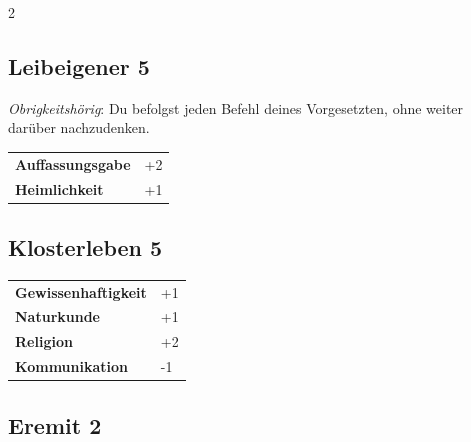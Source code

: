 \begin{multicols}{2}
\begin{tcolorbox}
    \subsection*{Leibeigener \hfill \small{5 }}
    \tcblower
\textit{Obrigkeitshörig}: Du befolgst jeden Befehl deines Vorgesetzten, ohne weiter darüber nachzudenken.


\vspace{3mm}

\begin{tabular}{@{}ll@{}}
    \textbf{Auffassungsgabe} & +2\\
    \textbf{Heimlichkeit} & +1\\
\end{tabular}


\end{tcolorbox}

\begin{tcolorbox}
    \subsection*{Klosterleben \hfill \small{5 }}
    \tcblower




\begin{tabular}{@{}ll@{}}
    \textbf{Gewissenhaftigkeit} & +1\\
    \textbf{Naturkunde} & +1\\
    \textbf{Religion} & +2\\
    \textbf{Kommunikation} & -1\\
\end{tabular}


\end{tcolorbox}

\begin{tcolorbox}
    \subsection*{Eremit \hfill \small{2 }}
    \tcblower





\end{tcolorbox}
\end{multicols}
